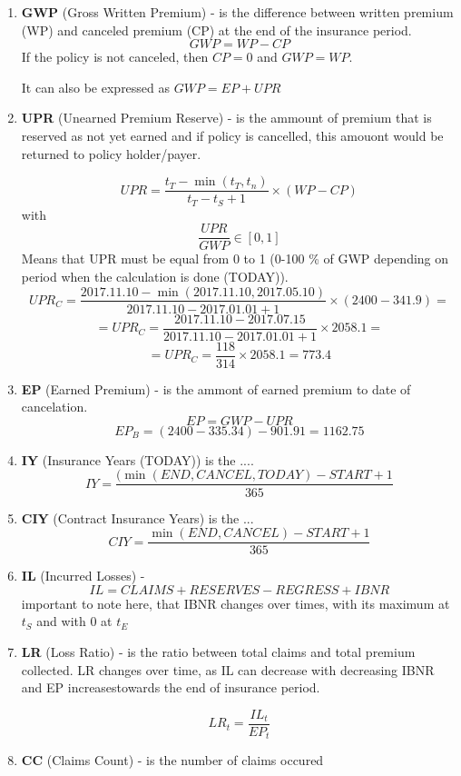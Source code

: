 \documentclass[11pt,a4paper,fleqn]{article}      %
\begin{document}
\begin{enumerate}

\item \textbf{GWP} (Gross Written Premium) - is the difference between written premium (WP) and canceled premium (CP) at the end of the insurance period. $$GWP=WP-CP$$ 
If the policy is not canceled, then $CP=0$ and $GWP=WP$.

It can also be expressed as $GWP=EP+UPR$

\item \textbf{UPR} (Unearned Premium Reserve) - is the ammount of premium that is reserved as not yet earned and if policy is cancelled, this amouont would be returned to policy holder/payer. 

$$UPR=\frac{t_T - \min(t_T,t_n)}{t_T - t_S +1 } \times (WP - CP)$$ 
with $$\frac{UPR}{GWP} \in [0,1]$$ Means that UPR must be equal from 0 to 1 (0-100 \% of GWP depending on period when the calculation is done (TODAY)).
$$UPR_C=\frac{2017.11.10-\min(2017.11.10,2017.05.10)}{2017.11.10-2017.01.01+1} \times (2400-341.9)=$$
$$=UPR_C=\frac{2017.11.10-2017.07.15}{2017.11.10-2017.01.01 +1} \times 2058.1=$$
$$=UPR_C=\frac{118}{314} \times 2058.1=773.4$$

\item \textbf{EP} (Earned Premium) - is the ammont of earned premium to date of cancelation. 
$$EP=GWP-UPR$$
$$EP_B=(2400-335.34)-901.91=1162.75$$


\item \textbf{IY} (Insurance Years (TODAY)) is the .... 
$$IY=\frac{(\min{(END, CANCEL, TODAY)}-START+1}{365}$$


\item \textbf{CIY} (Contract Insurance Years) is the ... 
$$CIY=\frac{\min(END, CANCEL) - START +1}{365}$$



\item \textbf{IL} (Incurred Losses) - 
$$IL=CLAIMS + RESERVES - REGRESS + IBNR$$ important to note here, that IBNR changes over times, with its maximum at $t_{S}$ and with 0 at $t_{E}$

\item \textbf{LR} (Loss Ratio) -  is the ratio between total claims and total premium collected. LR changes over time, as IL can decrease with decreasing IBNR and EP increasestowards the end of insurance period. 

$$LR_t=\frac{IL_t}{EP_t}$$

\item \textbf{CC} (Claims Count) - is the number of claims occured


\end{enumerate}
\end{document}
